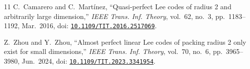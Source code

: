 \documentclass[12pt,letterpaper,onecolumn]{article}
\newcommand{\doi}[1]{\href{https://doi.org/#1}{\nolinkurl{#1}}}
\theoremstyle{definition}
\begin{document}
\begin{thebibliography}{11}
C.~Camarero and C.~Mart\'inez, ``Quasi-perfect Lee codes of radius 2 and arbitrarily large dimension,'' \emph{IEEE Trans. Inf. Theory}, vol.~62, no.~3, pp.~1183--1192, Mar.~2016, doi: \doi{10.1109/TIT.2016.2517069}.

Z.~Zhou and Y.~Zhou, ``Almost perfect linear Lee codes of packing radius 2 only exist for small dimensions,'' \emph{IEEE Trans. Inf. Theory}, vol.~70, no.~6, pp.~3965--3980, Jun.~2024, doi: \doi{10.1109/TIT.2023.3341954}.
\end{thebibliography}
 
\end{document}
